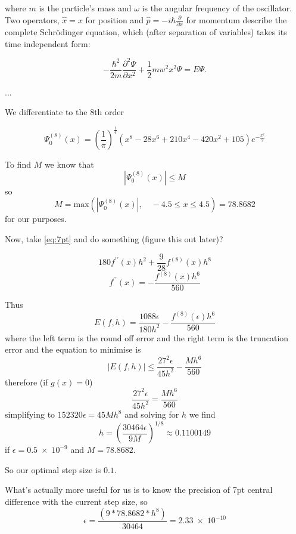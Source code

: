 where $m$ is the particle's mass and $ω$ is the angular frequency of the oscillator. Two operators, $\widehat{x} = x$ for position and $\widehat{p} = -i\hbar \frac{\partial}{\partial x}$ for momentum describe the complete Schr\"{o}dinger equation, which (after separation of variables) takes its time independent form:

\begin{equation}
-\frac{\hbar^2}{2m}\frac{\partial^2 \Psi}{\partial x^2}+\frac{1}{2}mw^2x^2 \Psi = E\Psi.
\end{equation}

...

We differentiate to the 8th order

\begin{equation}
\Psi_0^{(8)}(x) = \left(\frac{1}{\pi}\right)^{\frac{1}{4}}\left(x^8-28x^6+210x^4-420x^2+105\right)e^{-\frac{x^2}{2}}
\label{eq:7pt}
\end{equation}

To find $M$ we know that
\begin{equation}
 \left|\Psi_0^{(8)}(x)\right| \leq M
\end{equation}
so
\begin{equation}
M = \mathrm{max}\left(\left|\Psi_0^{(8)}(x)\right|, \quad -4.5 \leq x \leq 4.5\right) = 78.8682
\end{equation}
for our purposes.


Now, take \cref{eq:7pt} and do something (figure this out later)?

\begin{equation}
180f^{\prime\prime}(x)h^2+\frac{9}{28}f^{(8)}(x)h^8
\end{equation}
\begin{equation}
  f^{\prime\prime}(x)=-\frac{f^{(8)}(x)h^6}{560}
\end{equation}

Thus
\begin{equation}
  E(f,h) = \frac{1088\epsilon}{180h^2}-\frac{f^{(8)}(\epsilon)h^6}{560}
\end{equation}
where the left term is the round off error and the right term is the truncation error and the equation to minimise is
\begin{equation}
  \left|E(f,h)\right| \leq \frac{27^2\epsilon}{45h^2}-\frac{Mh^6}{560}
\end{equation}
therefore (if $g(x) = 0$)
\begin{equation}
  \frac{27^2\epsilon}{45h^2}=\frac{Mh^6}{560}
\end{equation}
simplifying to $152320\epsilon = 45Mh^8$ and solving for $h$ we find
\begin{equation}
  h = \left(\frac{30464\epsilon}{9M}\right)^{1/8} \approx 0.1100149
\end{equation}
if $\epsilon = 0.5\;\times\;10^{-9}$ and $M = 78.8682$.

So our optimal step size is $0.1$.

What's actually more useful for us is to know the precision of 7pt central difference with the current step size, so
\begin{equation}
\epsilon = \frac{\left(9*78.8682*h^8\right)}{30464} = 2.33\;\times\;10^{-10}
\end{equation}